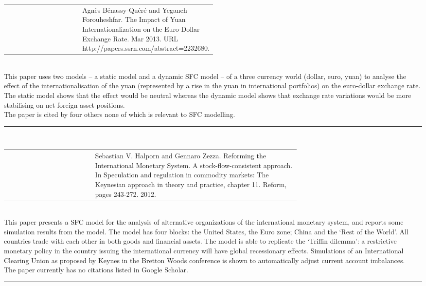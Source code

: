 \documentclass[twoside,a4paper,11pt]{article}
\begin{document}
\raggedright \begin{tabular}{lp{0.5\linewidth}}
\cite{Benassy-Quere2013}  & Agn\`es B\'enassy-Qu\'er\'e and Yeganeh Forouheshfar. The Impact of Yuan Internationalization on the Euro-Dollar Exchange Rate. Mar 2013. URL http://papers.ssrn.com/abstract=2232680.
\end{tabular}\\[5pt]
This paper uses two models -- a static model and a dynamic SFC model -- of a three currency world (dollar, euro, yuan) to analyse the effect of the internationalisation of the yuan (represented by a rise in the yuan in international portfolios) on the euro-dollar exchange rate. The static model shows that the effect would be neutral whereas the dynamic model shows that exchange rate variations would be more stabilising on net foreign asset positions.  \\[5pt]
The paper is cited by four others none of which is relevant to SFC modelling.\\
\centering \rule{5cm}{1pt}  \\[1cm]

\raggedright \begin{tabular}{lp{0.7\linewidth}}
\cite{Halporn2012} & Sebastian V. Halporn and Gennaro Zezza. Reforming the International Monetary System.
A stock-flow-consistent approach. In Speculation and regulation in commodity
markets: The Keynesian approach in theory and practice, chapter 11. Reform, pages 243-272. 2012.
\end{tabular}\\[5pt]
This paper presents a SFC model for the analysis of alternative organizations of the international monetary system, and reports some simulation results from the model. The model has four blocks: the United States, the Euro zone; China and the ‘Rest of the World’. All countries trade with each other in both goods and financial assets. The model is able to replicate the ‘Triffin dilemma’: a restrictive monetary policy in the country issuing the international currency will have global recessionary effects. Simulations of an International Clearing Union as proposed by Keynes in the Bretton Woods conference is shown to automatically adjust current account imbalances. \\[5pt]
The paper currently has no citations listed in Google Scholar.\\
\centering \rule{5cm}{1pt}  \\[1cm]
\end{document}
